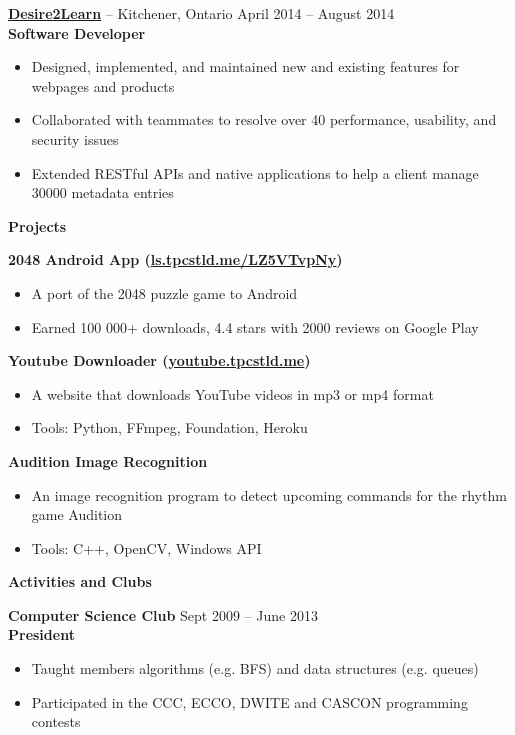 \documentclass{letter}
\begin{document}
\vspace{-1.5mm}
{\bfseries \href{http://www.d2l.com}{\uline{Desire2Learn}}} -- Kitchener, Ontario \hfill April 2014 -- August 2014 \\
{\bfseries Software Developer}
\vspace{-3mm}
\begin{itemize}
    \item Designed, implemented, and maintained new and existing features for webpages and products
    \item Collaborated with teammates to resolve over 40 performance, usability, and security issues
    \item Extended RESTful APIs and native applications to help a client manage 30000 metadata entries
\end{itemize}

{\bfseries \Large Projects}

\vspace{-1.5mm}
{\bfseries 2048 Android App (\href{http://ls.tpcstld.me/LZ5YTvpNy}{\uline{ls.tpcstld.me/LZ5VTvpNy}})}
\vspace{-3mm}
\begin{itemize}
    \item A port of the 2048 puzzle game to Android
    \item Earned 100 000+ downloads, 4.4 stars with 2000 reviews on Google Play
\end{itemize}
\vspace{-3mm}
{\bfseries Youtube Downloader (\href{http://youtube.tpcstld.me}{\uline{youtube.tpcstld.me}})}
\vspace{-3mm}
\begin{itemize}
    \item A website that downloads YouTube videos in mp3 or mp4 format
    \item Tools: Python, FFmpeg, Foundation, Heroku
\end{itemize}
\vspace{-3mm}
{\bfseries Audition Image Recognition}
\vspace{-3mm}
\begin{itemize}
    \item An image recognition program to detect upcoming commands for the rhythm game Audition
    \item Tools: C++, OpenCV, Windows API
\end{itemize}

{\bfseries \Large Activities and Clubs}

\vspace{-1.5mm}
{\bfseries Computer Science Club} \hfill Sept 2009 -- June 2013 \\
{\bfseries President}
\vspace{-3mm}
\begin{itemize}
  \item Taught members algorithms (e.g. BFS) and data structures (e.g. queues)
  \item Participated in the CCC, ECCO, DWITE and CASCON programming contests
\end{itemize}
\end{document}
